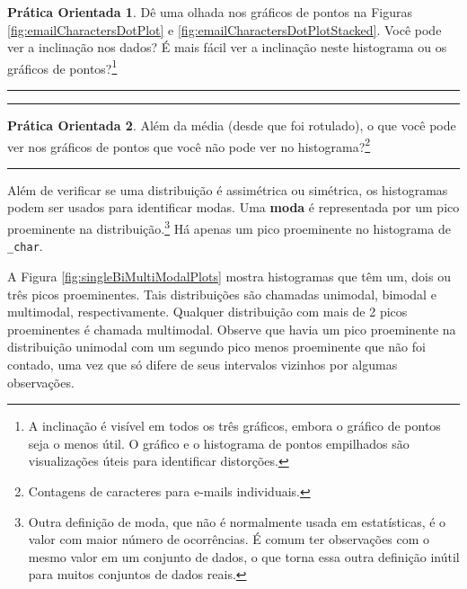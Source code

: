 \documentclass[
]{book}
\theoremstyle{definition}
\theoremstyle{definition}
\theoremstyle{definition}
\newtheorem{exercise}{Prática Orientada}[chapter]
\theoremstyle{definition}
\theoremstyle{remark}
\begin{document}
\begin{exercise}
\protect\hypertarget{exr:unnamed-chunk-21}{}{\label{exr:unnamed-chunk-21} }Dê uma olhada nos gráficos de pontos na Figuras \ref{fig:emailCharactersDotPlot} e \ref{fig:emailCharactersDotPlotStacked}. Você pode ver a inclinação nos dados? É mais fácil ver a inclinação neste histograma ou os gráficos de pontos?\footnote{A inclinação é visível em todos os três gráficos, embora o gráfico de pontos seja o menos útil. O gráfico e o histograma de pontos empilhados são visualizações úteis para identificar distorções.}
\end{exercise}

\begin{center}\rule{0.5\linewidth}{0.5pt}\end{center}

\begin{center}\rule{0.5\linewidth}{0.5pt}\end{center}

\begin{exercise}
\protect\hypertarget{exr:unnamed-chunk-22}{}{\label{exr:unnamed-chunk-22} }Além da média (desde que foi rotulado), o que você pode ver nos gráficos de pontos que você não pode ver no histograma?\footnote{Contagens de caracteres para e-mails individuais.}
\end{exercise}

\begin{center}\rule{0.5\linewidth}{0.5pt}\end{center}

Além de verificar se uma distribuição é assimétrica ou simétrica, os histogramas podem ser usados para identificar modas. Uma \textbf{moda} é representada por um pico proeminente na distribuição.\footnote{Outra definição de moda, que não é normalmente usada em estatísticas, é o valor com maior número de ocorrências. É comum ter observações com o mesmo valor em um conjunto de dados, o que torna essa outra definição inútil para muitos conjuntos de dados reais.} Há apenas um pico proeminente no histograma de \texttt{\_char}.

A Figura \ref{fig:singleBiMultiModalPlots} mostra histogramas que têm um, dois ou três picos proeminentes. Tais distribuições são chamadas unimodal, bimodal e multimodal, respectivamente. Qualquer distribuição com mais de 2 picos proeminentes é chamada multimodal. Observe que havia um pico proeminente na distribuição unimodal com um segundo pico menos proeminente que não foi contado, uma vez que só difere de seus intervalos vizinhos por algumas observações.
\end{document}
